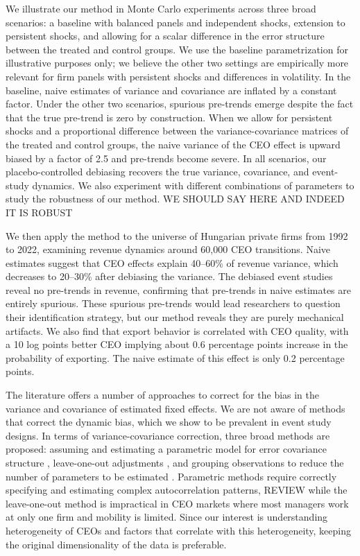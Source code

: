 \documentclass[11pt,a4paper]{article}
\begin{document}
We illustrate our method in Monte Carlo experiments across three broad scenarios: a baseline with balanced panels and independent shocks, extension to persistent shocks, and allowing for a scalar difference in the error structure between the treated and control groups. We use the baseline parametrization for illustrative purposes only; we believe the other two settings are empirically more relevant for firm panels with persistent shocks \citep{Olley1996-wy} and differences in volatility. In the baseline, naive estimates of variance and covariance are inflated by a constant factor. Under the other two scenarios, spurious pre-trends emerge despite the fact that the true pre-trend is zero by construction. When we allow for persistent shocks and a proportional difference between the variance-covariance matrices of the treated and control groups, the naive variance of the CEO effect is upward biased by a factor of 2.5 and pre-trends become severe. In all scenarios, our placebo-controlled debiasing recovers the true variance, covariance, and event-study dynamics. We also experiment with different combinations of parameters to study the robustness of our method. WE SHOULD SAY HERE AND INDEED IT IS ROBUST

We then apply the method to the universe of Hungarian private firms from 1992 to 2022, examining revenue dynamics around 60,000 CEO transitions. Naive estimates suggest that CEO effects explain 40--60\% of revenue variance, which decreases to 20--30\% after debiasing the variance. The debiased event studies reveal no pre-trends in revenue, confirming that pre-trends in naive estimates are entirely spurious. These spurious pre-trends would lead researchers to question their identification strategy, but our method reveals they are purely mechanical artifacts. We also find that export behavior is correlated with CEO quality, with a 10 log points better CEO implying about 0.6 percentage points increase in the probability of exporting. The naive estimate of this effect is only 0.2 percentage points.

The literature offers a number of approaches to correct for the bias in the variance and covariance of estimated fixed effects. We are not aware of methods that correct the dynamic bias, which we show to be prevalent in event study designs. In terms of variance-covariance correction, three broad methods are proposed: assuming and estimating a parametric model for error covariance structure \citep{andrews2008high,gaure2014correlation,kline2024firm}, leave-one-out adjustments \citep{kline2020leave}, and grouping observations to reduce the number of parameters to be estimated \citep{Bonhomme2019-xi}. Parametric methods require correctly specifying and estimating complex autocorrelation patterns, REVIEW while the leave-one-out method is impractical in CEO markets where most managers work at only one firm and mobility is limited. Since our interest is understanding heterogeneity of CEOs and factors that correlate with this heterogeneity, keeping the original dimensionality of the data is preferable. 
\end{document}
